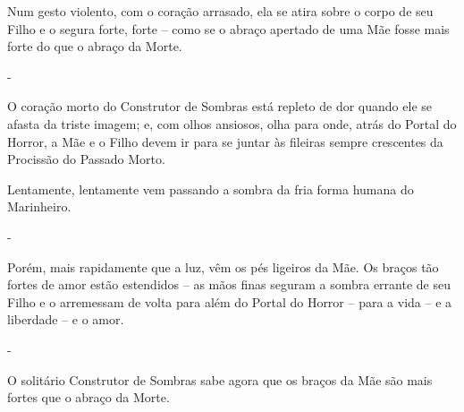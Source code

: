 Num gesto violento, com o coração arrasado, ela se atira sobre o corpo
de seu Filho e o segura forte, forte -- como se o abraço apertado de uma
Mãe fosse mais forte do que o abraço da Morte.

-

O coração morto do Construtor de Sombras está repleto de dor quando ele
se afasta da triste imagem; e, com olhos ansiosos, olha para onde, atrás
do Portal do Horror, a Mãe e o Filho devem ir para se juntar às fileiras
sempre crescentes da Procissão do Passado Morto.

Lentamente, lentamente vem passando a sombra da fria forma humana do
Marinheiro.

-

Porém, mais rapidamente que a luz, vêm os pés ligeiros da Mãe. Os braços
tão fortes de amor estão estendidos -- as mãos finas seguram a sombra
errante de seu Filho e o arremessam de volta para além do Portal do
Horror -- para a vida -- e a liberdade -- e o amor.

-

O solitário Construtor de Sombras sabe agora que os braços da Mãe são
mais fortes que o abraço da Morte.
